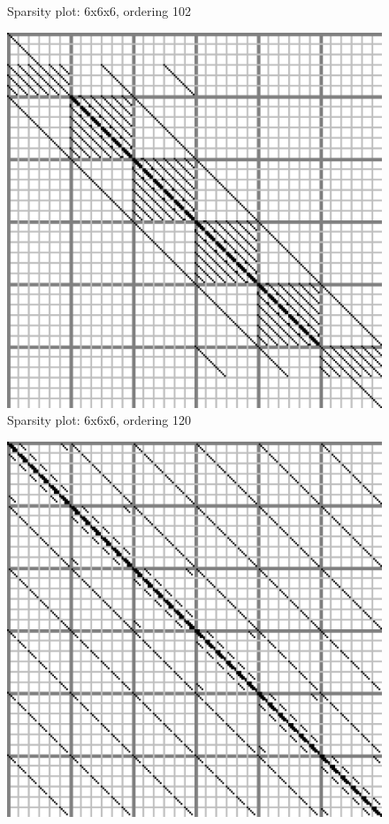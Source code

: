 \documentclass[10pt]{article}
\begin{document}
\begin{multicols}{2}
\begin{center}
\begin{minipage}[t]{.5\textwidth}
\begin{figure}[H]
	\caption{Sparsity plot: 6x6x6, ordering 102 }
\end{figure}
\end{minipage}%
\begin{minipage}[t]{.5\textwidth}%
\begin{figure}[H]
	\centering
	\includegraphics[width=\spwidth]{../img/sparsity/int_small_6x6x6_120.eps}
	\caption{Sparsity plot: 6x6x6, ordering 120 }
\end{figure}
\vspace{\spmgin}
\begin{figure}[H]
	\centering
	\includegraphics[width=\spwidth]{../img/sparsity/int_small_6x6x6_201.eps}

\end{figure}
\end{minipage}
\end{center}
\end{multicols}
\end{document}
